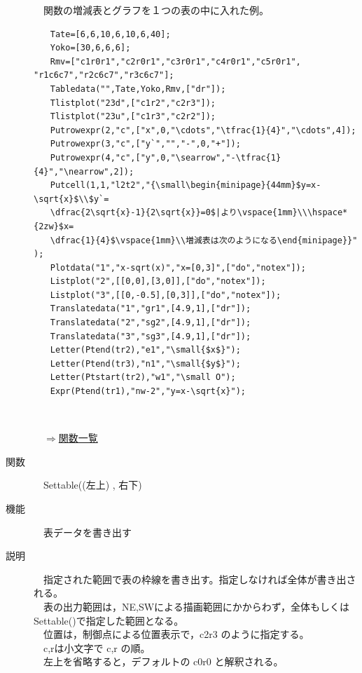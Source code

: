 \documentclass[papersize,a4paper,12pt,uplatex]{jsarticle}
\begin{document}
\begin{description}
　関数の増減表とグラフを１つの表の中に入れた例。
\begin{verbatim}
　　Tate=[6,6,10,6,10,6,40];
　　Yoko=[30,6,6,6];
　　Rmv=["c1r0r1","c2r0r1","c3r0r1","c4r0r1","c5r0r1", "r1c6c7","r2c6c7","r3c6c7"];
　　Tabledata("",Tate,Yoko,Rmv,["dr"]);
　　Tlistplot("23d",["c1r2","c2r3"]);
　　Tlistplot("23u",["c1r3","c2r2"]);
　　Putrowexpr(2,"c",["x",0,"\cdots","\tfrac{1}{4}","\cdots",4]);
　　Putrowexpr(3,"c",["y`","","-",0,"+"]);
　　Putrowexpr(4,"c",["y",0,"\searrow","-\tfrac{1}{4}","\nearrow",2]);
　　Putcell(1,1,"l2t2","{\small\begin{minipage}{44mm}$y=x-\sqrt{x}$\\$y`=
　　\dfrac{2\sqrt{x}-1}{2\sqrt{x}}=0$|より\vspace{1mm}\\\hspace*{2zw}$x=
　　\dfrac{1}{4}$\vspace{1mm}\\増減表は次のようになる\end{minipage}}" );
　　Plotdata("1","x-sqrt(x)","x=[0,3]",["do","notex"]);
　　Listplot("2",[[0,0],[3,0]],["do","notex"]);
　　Listplot("3",[[0,-0.5],[0,3]],["do","notex"]);
　　Translatedata("1","gr1",[4.9,1],["dr"]);
　　Translatedata("2","sg2",[4.9,1],["dr"]);
　　Translatedata("3","sg3",[4.9,1],["dr"]);
　　Letter(Ptend(tr2),"e1","\small{$x$}");
　　Letter(Ptend(tr3),"n1","\small{$y$}");
　　Letter(Ptstart(tr2),"w1","\small O");
　　Expr(Ptend(tr1),"nw-2","y=x-\sqrt{x}");
\end{verbatim}
　　　　　　　
\begin{flushright}　\hyperlink{functionlist}{$\Rightarrow$関数一覧}\end{flushright}

\hypertarget{settable}{}
\item[関数]　Settable((左上) , 右下)
\item[機能]　表データを書き出す
\item[説明]　指定された範囲で表の枠線を書き出す。指定しなければ全体が書き出される。\\
　表の出力範囲は，NE,SWによる描画範囲にかからわず，全体もしくはSettable()で指定した範囲となる。\\
　位置は，制御点による位置表示で，c2r3 のように指定する。\\
　c,rは小文字で c,r の順。\\
　左上を省略すると，デフォルトの c0r0 と解釈される。\\


\end{description}
\end{document}
